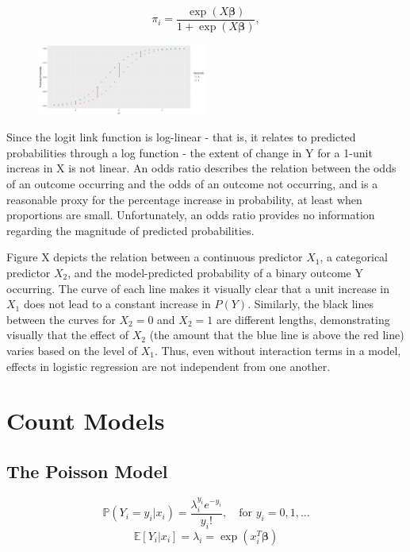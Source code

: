 \documentclass[jou, apacite]{apa6}
\begin{document}
\begin{equation} \label{log1}
\pi_i = \dfrac{\exp (X \bm{\beta})}{1 + \exp (X \bm{\beta})},
\end{equation}

\begin{figure}[h]
\includegraphics[width=0.5\textwidth]{LogisticFirstDiff.png}
\end{figure}

Since the logit link function is log-linear - that is, it relates to predicted probabilities through a log function - the extent of change in Y for a 1-unit increas in X is not linear. 
An odds ratio describes the relation between the odds of an outcome occurring and the odds of an outcome not occurring, and is a reasonable proxy for the percentage increase in probability, at least when proportions are small.
Unfortunately, an odds ratio provides no information regarding the magnitude of predicted probabilities.

Figure X depicts the relation between a continuous predictor $X_1$, a categorical predictor $X_2$, and the model-predicted probability of a binary outcome Y occurring. 
The curve of each line makes it visually clear that a unit increase in $X_1$ does not lead to a constant increase in $P(Y)$.
Similarly, the black lines between the curves for $X_2=0$ and $X_2=1$ are different lengths, demonstrating visually that the effect of $X_2$ (the amount that the blue line is above the red line) varies based on the level of $X_1$.
Thus, even without interaction terms in a model, effects in logistic regression are not independent from one another. 

\section{Count Models}

\subsection{The Poisson Model}

\begin{equation} \label{pois1}
\mathbb{P}(Y_i = y_i|x_i) = \dfrac{\lambda_i^{y_i}e^{-y_i}}{y_i!}, \quad\text{for } y_i = 0, 1, \dots
\end{equation}
\begin{equation} \label{pois2}
\mathbb{E}[Y_i|x_i] = \lambda_i = \exp (x_i^T \bm{\beta})
\end{equation}
\end{document}
